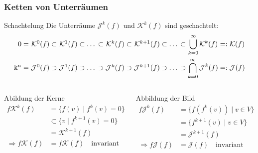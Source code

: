 %
%
%
\begin{frame}[t]
\setlength{\abovedisplayskip}{5pt}
\setlength{\belowdisplayskip}{5pt}
\frametitle{Ketten von Unterräumen}
\begin{block}{Schachtelung}
Die Unterräume $\mathcal{J}^k(f)$ und $\mathcal{K}^k(f)$ sind geschachtelt:
\[
\arraycolsep=1.4pt
\begin{array}{rcrcrcrcrcrcrcccc}
0       &=&\mathcal{K}^0(f)
	&\subset&\mathcal{K}^1(f)
	&\subset&\dots
	&\subset&\mathcal{K}^k(f)
	&\subset&\mathcal{K}^{k+1}(f)
	&\subset&\dots
	&\subset&\displaystyle\bigcup_{k=0}^\infty \mathcal{K}^k(f)
	&=:&\mathcal{K}(f)
\\[14pt]
\Bbbk^n &=&\mathcal{J}^0(f)
	&\supset&\mathcal{J}^1(f)
	&\supset&\dots
	&\supset&\mathcal{J}^{k}(f)
	&\supset&\mathcal{J}^{k+1}(f)
	&\supset&\dots
	&\supset&\displaystyle\bigcap_{k=0}^\infty \mathcal{J}^k(f)
	&=:&\mathcal{J}(f)
\end{array}
\]
\end{block}
\vspace{-20pt}
\begin{columns}[t,onlytextwidth]
\begin{column}{0.48\textwidth}
\begin{block}{Abildung der Kerne}
\vspace{-10pt}
\begin{align*}
f \mathcal{K}^k(f)
&=
\{f(v)\;|\; f^k(v) = 0\}
\\
&\subset
\{ v\;|\; f^{k+1}(v)=0\}
\\
&=
\mathcal{K}^{k+1}(f)
\\
\Rightarrow
f\mathcal{K}(f)&= f\mathcal{K}(f)
\quad\text{invariant}
\end{align*}
\end{block}
\end{column}
\begin{column}{0.48\textwidth}
\begin{block}{Abbildung der Bild}
\vspace{-10pt}
\begin{align*}
f\mathcal{J}^k(f)
&=
\{f(f^{k}(v))\;|\; v\in V\}
\\
&=
\{f^{k+1}(v)\;|\; v\in V\}
\\
&=
\mathcal{J}^{k+1}(f)
\\
\Rightarrow
f\mathcal{J}(f)&= \mathcal{J}(f)
\quad\text{invariant}
\end{align*}
\end{block}
\end{column}
\end{columns}
\end{frame}
